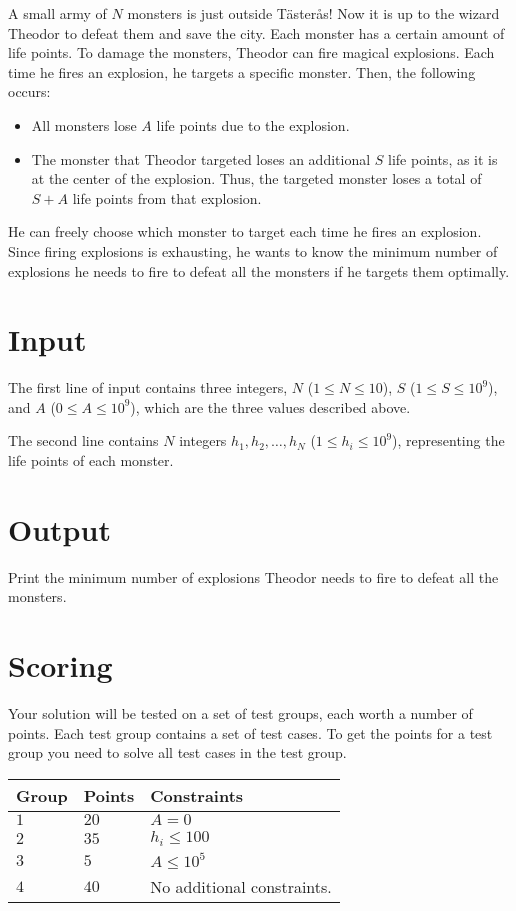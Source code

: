 
A small army of $N$ monsters is just outside Tästerås! Now it is up to the wizard Theodor to defeat
them and save the city. Each monster has a certain amount of life points. To damage the monsters,
Theodor can fire magical explosions. Each time he fires an explosion, he targets a specific monster.
Then, the following occurs:

\begin{itemize}
  \item All monsters lose $A$ life points due to the explosion.
  \item The monster that Theodor targeted loses an additional $S$ life points, as it is at the center of
  the explosion. Thus, the targeted monster loses a total of $S + A$ life points from that explosion.
\end{itemize}

He can freely choose which monster to target each time he fires an explosion. Since firing explosions
is exhausting, he wants to know the minimum number of explosions he needs to fire to defeat all the
monsters if he targets them optimally.

\section*{Input}  
The first line of input contains three integers, $N$ ($1 \leq N \leq 10$), $S$ ($1 \leq S \leq 10^9$), and $A$ ($0 \leq A \leq 10^9$), 
which are the three values described above.  

The second line contains $N$ integers $h_1, h_2, \ldots, h_N$ ($1 \leq h_i \leq 10^9$), representing the
life points of each monster.  

\section*{Output}  
Print the minimum number of explosions Theodor needs to fire to defeat all the monsters.  

\section*{Scoring}
Your solution will be tested on a set of test groups, each worth a number of points. Each test group contains
a set of test cases. To get the points for a test group you need to solve all test cases in the test group.

\noindent
\begin{tabular}{| l | l | p{12cm} |}
  \hline
  \textbf{Group} & \textbf{Points} & \textbf{Constraints} \\ \hline
  $1$    & $20$       & $A = 0$ \\ \hline
  $2$    & $35$       & $h_i \leq 100$ \\ \hline
  $3$    & $5$        & $A \leq 10^5$ \\ \hline
  $4$    & $40$       & No additional constraints. \\ \hline
\end{tabular}

